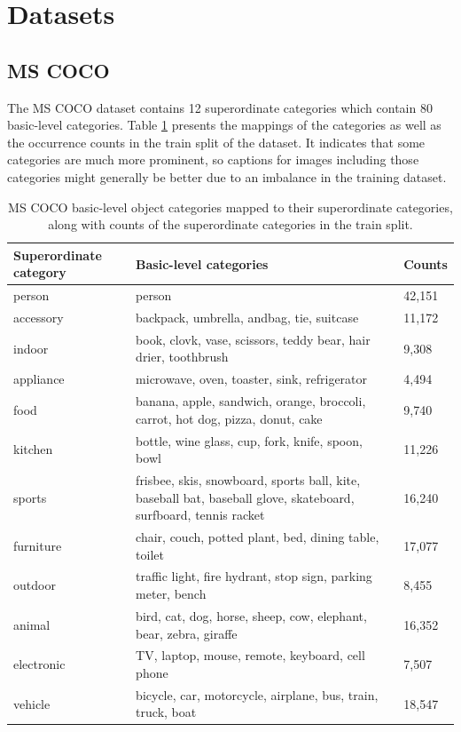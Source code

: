 \section{Datasets}
\subsection{MS COCO}
The MS COCO dataset \parencite{chen2015microsoft} contains 12 superordinate categories which contain 80 basic-level categories. Table \ref{tab:app_coco_categories} presents the mappings of the categories as well as the occurrence counts in the train split of the dataset. It indicates that some categories are much more prominent, so captions for images including those categories might generally be better due to an imbalance in the training dataset.

\begin{table}[h]
	\begin{tabularx}{\linewidth}{|X|X|l|}
		\hline
		\textbf{Superordinate category}                                    & \textbf{Basic-level categories} & \textbf{Counts}  \\ \hline
		person & person & 42,151\\  \hline
		accessory & backpack, umbrella, andbag, tie, suitcase &11,172 \\  \hline
		indoor & book, clovk, vase, scissors, teddy bear, hair drier, toothbrush & 9,308\\  \hline
		appliance & microwave, oven, toaster, sink, refrigerator & 4,494 \\  \hline
		food & banana, apple, sandwich, orange, broccoli, carrot, hot dog, pizza, donut, cake & 9,740 \\  \hline
		kitchen & bottle, wine glass, cup, fork, knife, spoon, bowl & 11,226\\  \hline
		sports & frisbee, skis, snowboard, sports ball, kite, baseball bat, baseball glove, skateboard, surfboard, tennis racket &16,240 \\  \hline
		furniture & chair, couch, potted plant, bed, dining table, toilet & 17,077\\  \hline
		outdoor & traffic light, fire hydrant, stop sign, parking meter, bench & 8,455\\  \hline
		animal & bird, cat, dog, horse, sheep, cow, elephant, bear, zebra, giraffe & 16,352\\  \hline
		electronic & TV, laptop, mouse, remote, keyboard, cell phone & 7,507 \\  \hline
		vehicle & bicycle, car, motorcycle, airplane, bus, train, truck, boat & 18,547\\ 
		\hline
	\end{tabularx}
	\caption{\label{tab:app_coco_categories} MS COCO basic-level object categories mapped to their superordinate categories, along with counts of the superordinate categories in the train split.}
\end{table}

